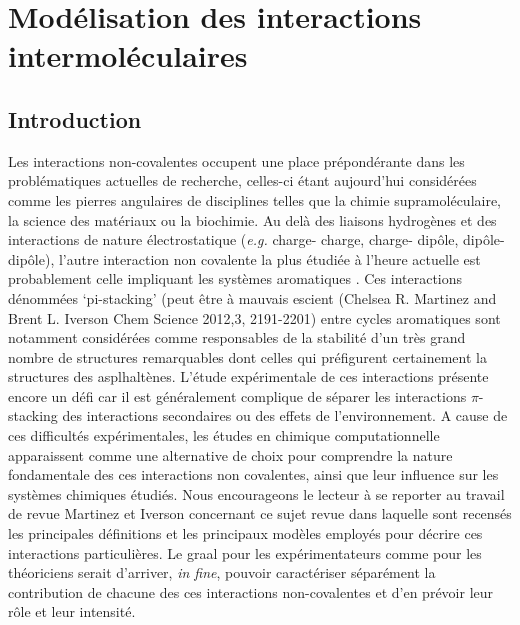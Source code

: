 \chapter[Modélisation des interactions intermoléculaires]{Modélisation des interactions intermoléculaires}
\minitoc
\restoregeometry

\newpage

\section*{Introduction}

Les interactions non-covalentes occupent une place prépondérante dans les problématiques actuelles de recherche, celles-ci étant aujourd'hui considérées comme les pierres angulaires de disciplines telles que la chimie supramoléculaire, la science des matériaux ou la biochimie.  Au delà des liaisons hydrogènes et des interactions de nature électrostatique (\textit{e.g.} charge- charge, charge- dipôle, dipôle- dipôle), l’autre interaction non covalente la plus étudiée à l’heure actuelle est probablement celle impliquant les systèmes aromatiques \cite{grimme2008special}. Ces interactions dénommées ‘pi-stacking’ (peut être à mauvais escient (Chelsea R. Martinez and Brent L. Iverson Chem Science 2012,3, 2191-2201) entre cycles aromatiques sont notamment considérées comme responsables de la stabilité d’un très grand nombre de structures remarquables \cite{mcgaughey1998pi} dont celles qui préfigurent certainement la structures des asplhaltènes. L’étude expérimentale de ces interactions présente encore un défi car il est généralement complique de séparer les interactions $\pi$-stacking des interactions secondaires ou des effets de l’environnement. A cause de ces difficultés expérimentales, les études en chimique computationnelle apparaissent comme une alternative de choix pour comprendre la nature fondamentale des ces interactions non covalentes, ainsi que leur influence sur les systèmes chimiques étudiés. Nous encourageons le lecteur à se reporter au travail de revue Martinez et Iverson concernant ce sujet
revue dans laquelle sont recensés les principales définitions et les principaux modèles employés pour décrire ces interactions particulières.
Le graal pour les expérimentateurs comme pour les théoriciens serait d’arriver, \textit{in fine}, pouvoir caractériser séparément la contribution de chacune des ces interactions non-covalentes et d’en prévoir leur rôle et leur intensité.\\


